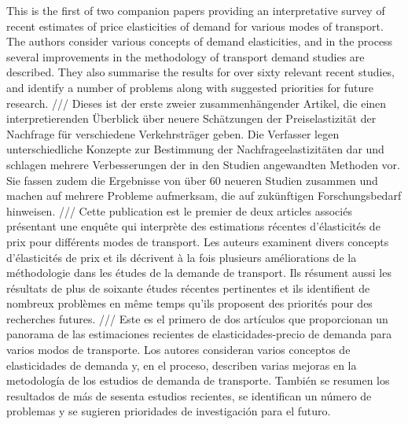 This is the first of two companion papers providing an interpretative survey of recent estimates of price elasticities of demand for various modes of transport. The authors consider various concepts of demand elasticities, and in the process several improvements in the methodology of transport demand studies are described. They also summarise the results for over sixty relevant recent studies, and identify a number of problems along with suggested priorities for future research. /// Dieses ist der erste zweier zusammenhängender Artikel, die einen interpretierenden Überblick über neuere Schätzungen der Preiselastizität der Nachfrage für verschiedene Verkehrsträger geben. Die Verfasser legen unterschiedliche Konzepte zur Bestimmung der Nachfrageelastizitäten dar und schlagen mehrere Verbesserungen der in den Studien angewandten Methoden vor. Sie fassen zudem die Ergebnisse von über 60 neueren Studien zusammen und machen auf mehrere Probleme aufmerksam, die auf zukünftigen Forschungsbedarf hinweisen. /// Cette publication est le premier de deux articles associés présentant une enquête qui interprète des estimations récentes d'élasticités de prix pour différents modes de transport. Les auteurs examinent divers concepts d'élasticités de prix et ils décrivent à la fois plusieurs améliorations de la méthodologie dans les études de la demande de transport. Ils résument aussi les résultats de plus de soixante études récentes pertinentes et ils identifient de nombreux problèmes en même temps qu'ils proposent des priorités pour des recherches futures. /// Este es el primero de dos artículos que proporcionan un panorama de las estimaciones recientes de elasticidades-precio de demanda para varios modos de transporte. Los autores consideran varios conceptos de elasticidades de demanda y, en el proceso, describen varias mejoras en la metodología de los estudios de demanda de transporte. También se resumen los resultados de más de sesenta estudios recientes, se identifican un número de problemas y se sugieren prioridades de investigación para el futuro.